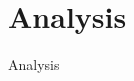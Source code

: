 \documentclass[Masterthesis.tex]{subfiles}
\begin{document}
\chapter{Analysis}
\label{chap:analysis}

Analysis
\end{document}
